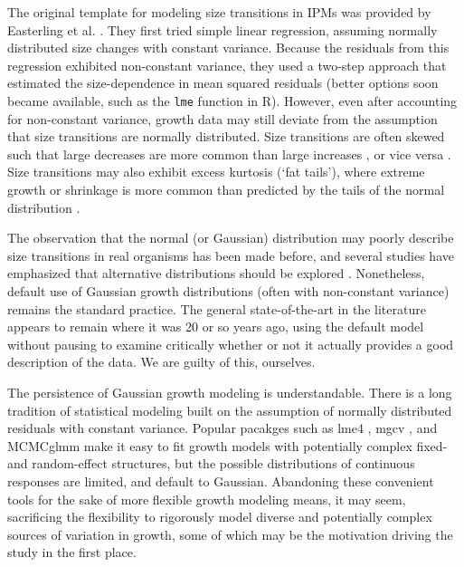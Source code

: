 \documentclass[12pt]{article}
\begin{document}
The original template for modeling size transitions in IPMs was provided by Easterling et al. \citeyear{easterling2000size}. 
They first tried simple linear regression, assuming normally distributed size changes with constant variance. 
Because the residuals from this regression exhibited non-constant variance, they used a two-step approach that estimated the size-dependence in mean squared residuals (better options soon became available, such as the \texttt{lme} function in R). 
However, even after accounting for non-constant variance, growth data may still deviate from the assumption that size transitions are normally distributed.  
Size transitions are often skewed such that large decreases are more common than large increases \citep{peterson2019improving,salguero2010keeping}, or vice versa \citep{stubberud2019effects}.
Size transitions may also exhibit excess kurtosis (`fat tails'), where extreme growth or shrinkage is more common than predicted by the tails of the normal distribution \citep{herault2011functional}. 

The observation that the normal (or Gaussian) distribution may poorly describe size transitions in real organisms has been made before,  
and several studies have emphasized that alternative distributions should be explored \citep{easterling2000size,peterson2019improving,rees2014building,williams2012avoiding}. 
Nonetheless, default use of Gaussian growth distributions (often with non-constant variance) remains the standard practice. 
The general state-of-the-art in the literature appears to remain where it was 20 or so years ago, using the default model without pausing to examine critically whether or not it actually provides a good description of the data. 
We are guilty of this, ourselves. 

The persistence of Gaussian growth modeling is understandable. 
There is a long tradition of statistical modeling built on the assumption of normally distributed residuals with constant variance.
Popular pacakges such as lme4 \citep{bates2007lme4}, mgcv \citep{wood-2017}, and MCMCglmm \citep{hadfield2010mcmc} make it easy to fit growth models with potentially complex fixed- and random-effect structures, but the possible distributions of continuous responses are limited, and default to Gaussian.
Abandoning these convenient tools for the sake of more flexible growth modeling means, it may seem, sacrificing the flexibility to rigorously model diverse and potentially complex sources of variation in growth, some of which may be the motivation driving the study in the first place.
\end{document}
